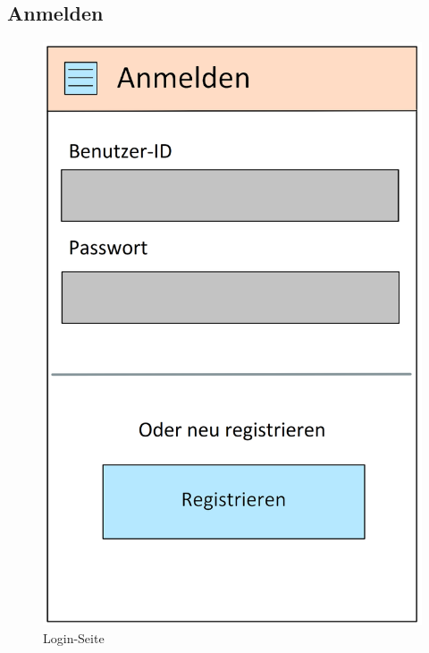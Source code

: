 \subsection{Anmelden}

\begin{figure}[H]
	\begin{minipage}[c]{.5\textwidth} 
		\includegraphics[width=\textwidth]{gui/anmelden.png}			
		\caption{Login-Seite}
		\label{anmelden}
	\end{minipage} \hspace{.7cm}
	\begin{minipage}[c]{.5\textwidth} 

\end{minipage}
\end{figure}
